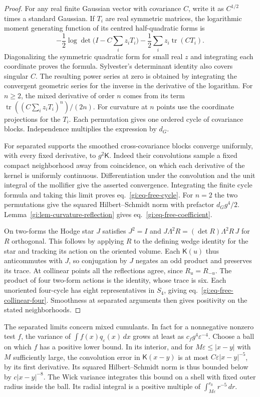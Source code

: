 \documentclass[11pt,letterpaper,reqno]{amsart}
\numberwithin{equation}{section}
\renewcommand{\eqref}[1]{\textup{eq.~\ref{#1}}}
\theoremstyle{definition}
\theoremstyle{remark}
\begin{document}
\begin{proof}
For any real finite Gaussian vector with covariance \(C\),
write it as \(C^{1/2}\) times a standard Gaussian. If \(T_i\)
are real symmetric matrices, the logarithmic moment generating
function of its centred half-quadratic forms is
\[
 -\frac12\log\det\bigl(I-C\textstyle\sum_i z_iT_i\bigr)
                 -\frac12\sum_i z_i\operatorname{tr}(CT_i).
\]
Diagonalizing the symmetric quadratic form for small real \(z\)
and integrating each coordinate proves the formula. Sylvester's
determinant identity also covers singular \(C\). The resulting
power series at zero is obtained by integrating the convergent
geometric series for the inverse in the derivative of the
logarithm. For \(n\ge2\), the mixed derivative of order \(n\)
comes from its term \(\operatorname{tr}((C\sum_i z_iT_i)^n)/(2n)\).
For curvature at \(n\) points use the coordinate projections for
the \(T_i\). Each permutation gives one ordered cycle of
covariance blocks. Independence multiplies the expression
by \(d_G\).

For separated supports the smoothed cross-covariance blocks
converge uniformly, with every fixed derivative, to
\(g^2\mathsf K\). Indeed their convolutions sample a fixed
compact neighborhood away from coincidence, on which each
derivative of the kernel is uniformly continuous. Differentiation
under the convolution and the unit integral of the mollifier
give the asserted convergence. Integrating the finite cycle formula and taking
this limit proves \eqref{gi:eq-free-cycle}. For \(n=2\) the
two permutations give the squared Hilbert--Schmidt norm with
prefactor \(d_Gg^4/2\). Lemma~\ref{gi:lem-curvature-reflection}
gives \eqref{gi:eq-free-coefficient}.

On two-forms the Hodge star \(J\) satisfies \(J^2=I\) and
\(J\Lambda^2R=(\det R)\Lambda^2R\,J\) for \(R\) orthogonal.
This follows by applying \(R\) to the defining wedge identity
for the star and tracking its action on the oriented volume.
Each \(\mathsf K(u)\) thus anticommutes with \(J\), so
conjugation by \(J\) negates an odd product and preserves its trace.
At collinear points all the reflections agree, since
\(R_u=R_{-u}\). The product of four two-form actions is the
identity, whose trace is six. Each unoriented four-cycle has
eight representatives in \(S_4\), giving
\eqref{gi:eq-free-collinear-four}. Smoothness at separated
arguments then gives positivity on the stated neighborhoods.
\end{proof}

The separated limits concern mixed cumulants. In fact for a
nonnegative nonzero test \(f\), the variance of
\(\int f(x)q_\varepsilon(x)\,dx\) grows at least as
\(c_f g^4\varepsilon^{-4}\). Choose a ball on which \(f\)
has a positive lower bound. In its interior, and for
\(M\varepsilon\le |x-y|\) with \(M\) sufficiently large,
the convolution error in \(\mathsf K(x-y)\) is at most
\(C\varepsilon|x-y|^{-5}\), by its first derivative.
Its squared Hilbert--Schmidt norm is thus bounded below by
\(c|x-y|^{-8}\). The Wick variance integrates this
bound on a shell with fixed outer radius inside the ball.
Its radial integral is a positive multiple of
\(\int_{M\varepsilon}^{r_0}r^{-5}\,dr\).
\end{document}
